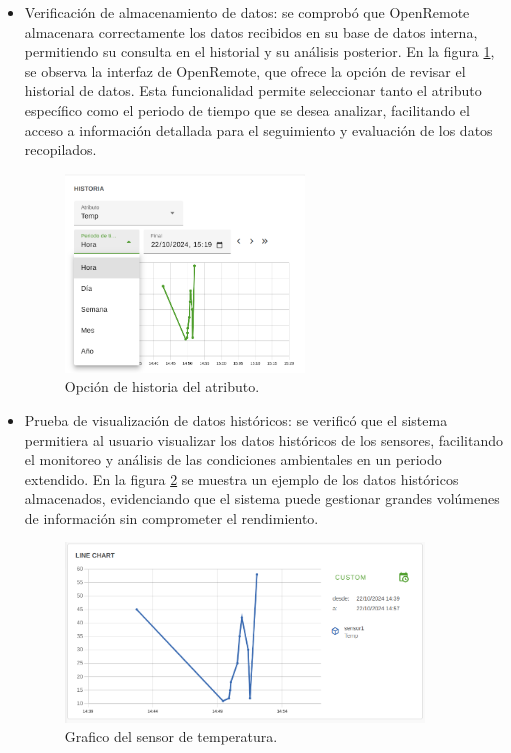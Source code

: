 \begin{itemize}
    \item Verificación de almacenamiento de datos: se comprobó que OpenRemote almacenara correctamente los datos recibidos en su base de datos interna, permitiendo su consulta en el historial y su análisis posterior. En la figura \ref{fig:op_historia}, se observa la interfaz de OpenRemote, que ofrece la opción de revisar el historial de datos. Esta funcionalidad permite seleccionar tanto el atributo específico como el periodo de tiempo que se desea analizar, facilitando el acceso a información detallada para el seguimiento y evaluación de los datos recopilados.

\begin{figure}[H]
\centering 
\includegraphics[width=0.6\textwidth]{./Figures/op_historia.png}
\caption{Opción de historia del atributo.}
\label{fig:op_historia}
\end{figure}  
    
    \item Prueba de visualización de datos históricos: se verificó que el sistema permitiera al usuario visualizar los datos históricos de los sensores, facilitando el monitoreo y análisis de las condiciones ambientales en un periodo extendido. En la figura \ref{fig:op_historial} se muestra un ejemplo de los datos históricos almacenados, evidenciando que el sistema puede gestionar grandes volúmenes de información sin comprometer el rendimiento.
    
\begin{figure}[H]
\centering 
\includegraphics[width=0.9\textwidth]{./Figures/op_historial.png}
\caption{Grafico del sensor de temperatura.}
\label{fig:op_historial}
\end{figure}  
    
    
\end{itemize}




